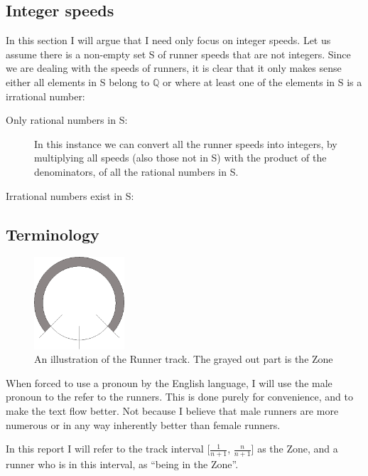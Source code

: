 \subsection{Integer speeds}
In this section I will argue that I need only focus on integer speeds.
Let us assume there is a non-empty set S of runner speeds that are not integers. Since we are dealing with the speeds of runners, it is clear that it only makes sense either all elements in S belong to $\mathbb{Q}$ or where at least one of the elements in S is a irrational number:
\begin{description}
\item[Only rational numbers in S:] In this instance we can convert all the runner speeds into integers, by multiplying all speeds (also those not in S) with the product of the denominators, of all the rational numbers in S.
\item[Irrational numbers exist in S:]   
\end{description}

\subsection{Terminology}
\label{Termonolgy}
\begin{figure}[H]
  \centering
  \includegraphics[width=0.3\textwidth]{./images/circleZonePng.png}
  \caption{\label{circleZoneImg}An illustration of the Runner track. The grayed out part is the Zone}
\end{figure}

When forced to use a pronoun by the English language, I will use the male pronoun to the refer to the runners. This is done purely for convenience, and to make the text flow better. Not because I believe that male runners are more numerous or in any way inherently better than female runners.

\begin{defi}
\label{def:theZone}
In this report I will refer to the track interval [$\frac{1}{n + 1}$, $\frac{n}{n+1}$] as the Zone, and a runner who is in this interval, as ``being in the Zone''.
\end{defi}

